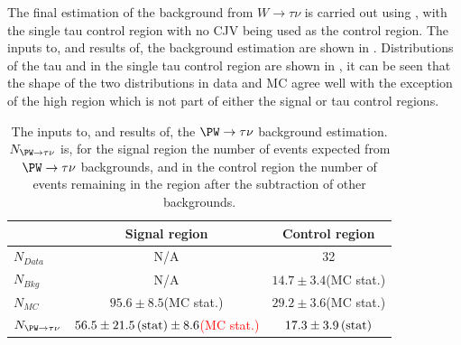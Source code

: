 The final estimation of the background from $W\rightarrow\tau\nu$ is carried out using , with the single tau control region with no \ac{CJV} being used as the control region. The inputs to, and results of, the background estimation are shown in . Distributions of the tau \pt and \dphijj in the single tau control region are shown in , it can be seen that the shape of the two distributions in data and \ac{MC} agree well with the exception of the high \dphijj region which is not part of either the signal or tau control regions.

\begin{table}
  \caption{The inputs to, and results of, the $\PW\rightarrow \tau\nu$ background estimation. $N_{\PW\rightarrow \tau\nu}$ is, for the signal region the number of events expected from $\PW\rightarrow \tau\nu$ backgrounds, and in the control region the number of events remaining in the region after the subtraction of other backgrounds.}
  \label{tab:promptwtaunu}
  \begin{tabular}{lcc}
    \hline
    \hline
    & Signal region & Control region \\
    \hline
    \hline
    $N_{Data}$ & N/A & 32\\
    $N_{Bkg}$ & N/A & $14.7\pm 3.4$(\ac{MC} stat.) \\
    $N_{MC}$& $95.6\pm 8.5$(\ac{MC} stat.) & $29.2\pm 3.6$(\ac{MC} stat.) \\
    \hline
    $N_{\PW\rightarrow \tau\nu}$& \textcolor{red}{$56.5\pm 21.5\,\text{(stat)}\pm 8.6$(MC stat.)} & $17.3\pm 3.9 \,\text{(stat)}$ \\
    \hline
    \hline
  \end{tabular}
\end{table}

